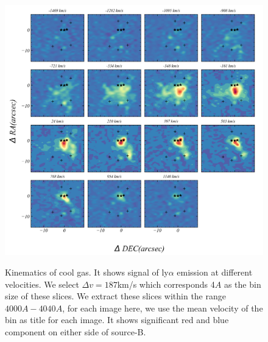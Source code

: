 \documentclass[../Results.tex]{subfiles}
\begin{document}
	\begin{figure}[htp]
		\centering
		\includegraphics[width=\textwidth]{figs/slices}
		\label{slices}
		\caption{Kinematics of cool gas. It shows signal of ly$\alpha$ emission at different velocities. We select $\Delta v=187$km/s which corresponds 4$A$  as the bin size of these slices. We extract these slices within the range $4000A-4040A$, for each image here, we use the mean velocity of the bin as title for each image. It shows significant red and blue component on either side of source-B.}
	\end{figure}
	
\end{document}
